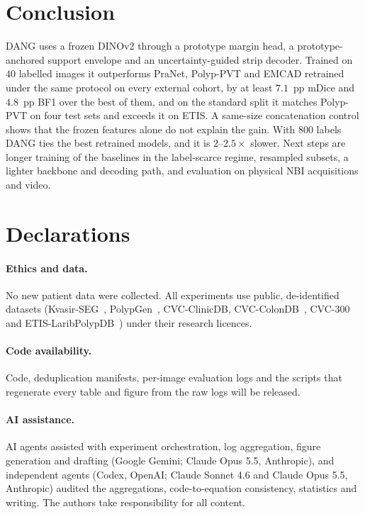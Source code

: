 \documentclass[10pt,twocolumn]{article}
\begin{document}
\section{Conclusion}
DANG uses a frozen DINOv2 through a prototype margin head, a prototype-anchored support envelope and an uncertainty-guided strip decoder. Trained on $40$ labelled images it outperforms PraNet, Polyp-PVT and EMCAD retrained under the same protocol on every external cohort, by at least $7.1$~pp mDice and $4.8$~pp BF1 over the best of them, and on the standard split it matches Polyp-PVT on four test sets and exceeds it on ETIS. A same-size concatenation control shows that the frozen features alone do not explain the gain. With $800$ labels DANG ties the best retrained models, and it is $2$--$2.5\times$ slower. Next steps are longer training of the baselines in the label-scarce regime, resampled subsets, a lighter backbone and decoding path, and evaluation on physical NBI acquisitions and video.

\section*{Declarations}
\paragraph{Ethics and data.} No new patient data were collected. All experiments use public, de-identified datasets (Kvasir-SEG~\citep{jha2020kvasir}, PolypGen~\citep{ali2023polypgen}, CVC-ClinicDB, CVC-ColonDB~\citep{tajbakhsh2015automated}, CVC-300 and ETIS-LaribPolypDB~\citep{silva2014toward}) under their research licences.

\paragraph{Code availability.} Code, deduplication manifests, per-image evaluation logs and the scripts that regenerate every table and figure from the raw logs will be released.

\paragraph{AI assistance.} AI agents assisted with experiment orchestration, log aggregation, figure generation and drafting (Google Gemini; Claude Opus 5.5, Anthropic), and independent agents (Codex, OpenAI; Claude Sonnet 4.6 and Claude Opus 5.5, Anthropic) audited the aggregations, code-to-equation consistency, statistics and writing. The authors take responsibility for all content.
\end{document}

